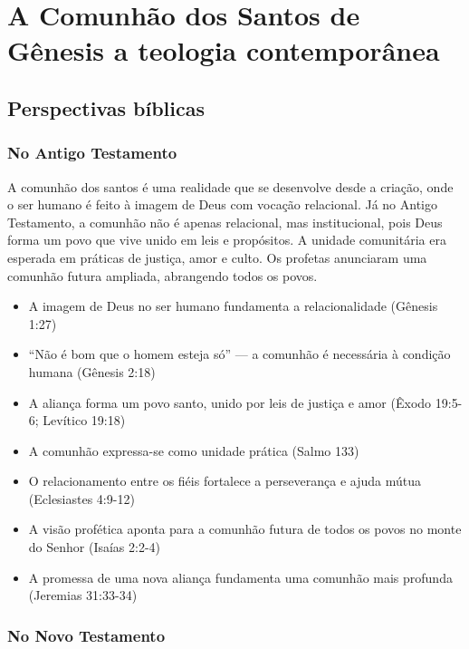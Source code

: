 \newpage
\section{A Comunhão dos Santos de Gênesis a teologia contemporânea}

\subsection{Perspectivas bíblicas}

\subsubsection{No Antigo Testamento}
A comunhão dos santos é uma realidade que se desenvolve desde a criação, onde o ser humano é feito à imagem de Deus com vocação relacional. Já no Antigo Testamento, a comunhão não é apenas relacional, mas institucional, pois Deus forma um povo que vive unido em leis e propósitos. A unidade comunitária era esperada em práticas de justiça, amor e culto. Os profetas anunciaram uma comunhão futura ampliada, abrangendo todos os povos.

\begin{itemize}
\item A imagem de Deus no ser humano fundamenta a relacionalidade (Gênesis 1:27)
\item ``Não é bom que o homem esteja só'' — a comunhão é necessária à condição humana (Gênesis 2:18)
\item A aliança forma um povo santo, unido por leis de justiça e amor (Êxodo 19:5-6; Levítico 19:18)
\item A comunhão expressa-se como unidade prática (Salmo 133)
\item O relacionamento entre os fiéis fortalece a perseverança e ajuda mútua (Eclesiastes 4:9-12)
\item A visão profética aponta para a comunhão futura de todos os povos no monte do Senhor (Isaías 2:2-4)
\item A promessa de uma nova aliança fundamenta uma comunhão mais profunda (Jeremias 31:33-34)
\end{itemize}

\subsubsection{No Novo Testamento}

